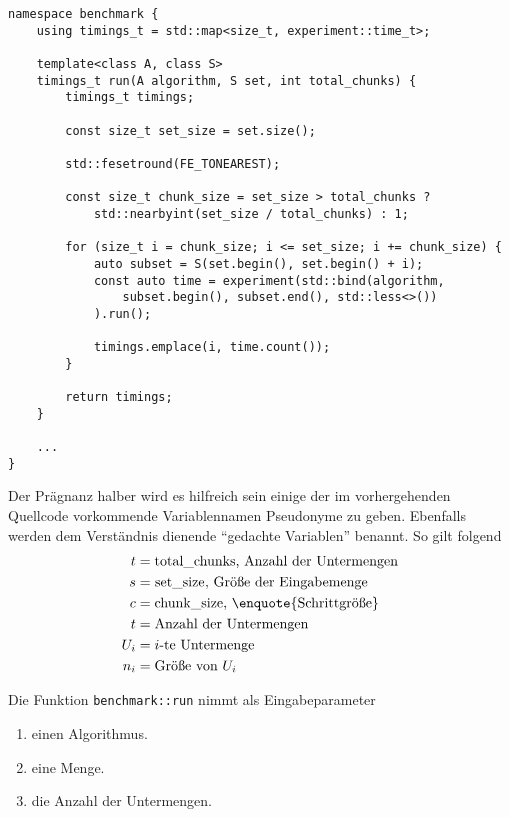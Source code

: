 \begin{lstlisting}[label=lst:benchmark, caption={Implementation einer Funktion zur Ermittlung der praktischen Effizienz eines Algorotihmus mit einer bestimmenten Eingabemenge.}]
namespace benchmark {
	using timings_t = std::map<size_t, experiment::time_t>;

	template<class A, class S>
	timings_t run(A algorithm, S set, int total_chunks) {
		timings_t timings;

		const size_t set_size = set.size();

		std::fesetround(FE_TONEAREST);

		const size_t chunk_size = set_size > total_chunks ?
			std::nearbyint(set_size / total_chunks) : 1;

		for (size_t i = chunk_size; i <= set_size; i += chunk_size) {
			auto subset = S(set.begin(), set.begin() + i);
			const auto time = experiment(std::bind(algorithm,
				subset.begin(), subset.end(), std::less<>())
			).run();

			timings.emplace(i, time.count());
		}

		return timings;
	}
	
	...
}
\end{lstlisting}

Der Prägnanz halber wird es hilfreich sein einige der im vorhergehenden Quellcode vorkommende Variablennamen Pseudonyme zu geben. Ebenfalls werden dem Verständnis dienende \enquote{gedachte Variablen} benannt. So gilt folgend
\begin{equation*}
	\begin{aligned}
		t &= \text{\lstinline{total_chunks}, Anzahl der Untermengen} \\
		s &= \text{\lstinline{set_size}, Größe der Eingabemenge} \\
		c &= \text{\lstinline{chunk_size}, \enquote{Schrittgröße}} \\
		t &= \text{Anzahl der Untermengen} \\
		U_i &= \text{$i$-te Untermenge} \\
		n_i &= \text{Größe von $U_i$} \\
	\end{aligned}
\end{equation*}

Die Funktion \lstinline{benchmark::run} nimmt als Eingabeparameter
\begin{enumerate}{nosep, label=(\alph*)}
	\item einen Algorithmus.
	\item eine Menge.
	\item die Anzahl der Untermengen.
\end{enumerate}

